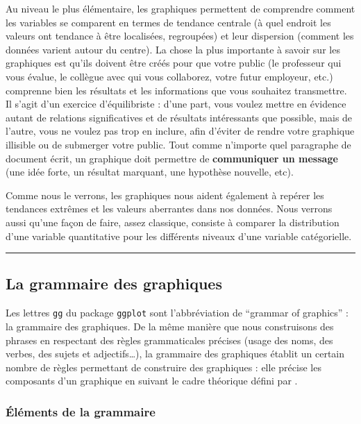 \documentclass[a4paperpaper,]{article}
\theoremstyle{definition}
\theoremstyle{definition}
\theoremstyle{definition}
\theoremstyle{remark}
\begin{document}
Au niveau le plus élémentaire, les graphiques permettent de comprendre
comment les variables se comparent en termes de tendance centrale (à
quel endroit les valeurs ont tendance à être localisées, regroupées) et
leur dispersion (comment les données varient autour du centre). La chose
la plus importante à savoir sur les graphiques est qu'ils doivent être
créés pour que votre public (le professeur qui vous évalue, le collègue
avec qui vous collaborez, votre futur employeur, etc.) comprenne bien
les résultats et les informations que vous souhaitez transmettre. Il
s'agit d'un exercice d'équilibriste : d'une part, vous voulez mettre en
évidence autant de relations significatives et de résultats intéressants
que possible, mais de l'autre, vous ne voulez pas trop en inclure, afin
d'éviter de rendre votre graphique illisible ou de submerger votre
public. Tout comme n'importe quel paragraphe de document écrit, un
graphique doit permettre de \textbf{communiquer un message} (une idée
forte, un résultat marquant, une hypothèse nouvelle, etc).

Comme nous le verrons, les graphiques nous aident également à repérer
les tendances extrêmes et les valeurs aberrantes dans nos données. Nous
verrons aussi qu'une façon de faire, assez classique, consiste à
comparer la distribution d'une variable quantitative pour les différents
niveaux d'une variable catégorielle.

\begin{center}\rule{0.5\linewidth}{\linethickness}\end{center}

\subsection{La grammaire des graphiques}\label{gggraph}

Les lettres \texttt{gg} du package \texttt{ggplot} sont l'abbréviation
de ``grammar of graphics'' : la grammaire des graphiques. De la même
manière que nous construisons des phrases en respectant des règles
grammaticales précises (usage des noms, des verbes, des sujets et
adjectifs\ldots{}), la grammaire des graphiques établit un certain
nombre de règles permettant de construire des graphiques : elle précise
les composants d'un graphique en suivant le cadre théorique défini par
\citet{wilkinson2005}.

\subsubsection{Éléments de la grammaire}\label{elements-de-la-grammaire}
\end{document}
